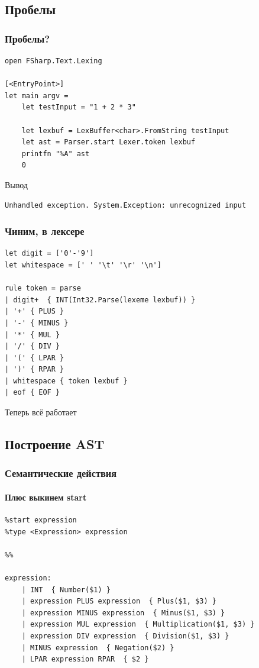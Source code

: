 \documentclass[xetex,mathserif,serif]{beamer}
\begin{document}
    \subsection{Пробелы}

    \begin{frame}[fragile]
        \frametitle{Пробелы?}
        \begin{verbatim}
open FSharp.Text.Lexing

[<EntryPoint>]
let main argv =
    let testInput = "1 + 2 * 3"

    let lexbuf = LexBuffer<char>.FromString testInput
    let ast = Parser.start Lexer.token lexbuf
    printfn "%A" ast
    0 
        \end{verbatim}
        \begin{exampleblock}{Вывод}
            \begin{verbatim}
Unhandled exception. System.Exception: unrecognized input
            \end{verbatim}
        \end{exampleblock}
    \end{frame}

    \begin{frame}[fragile]
        \frametitle{Чиним, в лексере}
        \begin{verbatim}
let digit = ['0'-'9']
let whitespace = [' ' '\t' '\r' '\n']

rule token = parse
| digit+  { INT(Int32.Parse(lexeme lexbuf)) }
| '+' { PLUS }
| '-' { MINUS }
| '*' { MUL }
| '/' { DIV }
| '(' { LPAR }
| ')' { RPAR }
| whitespace { token lexbuf }
| eof { EOF }
        \end{verbatim}
        Теперь всё работает
    \end{frame}

    \subsection{Построение AST}

    \begin{frame}[fragile]
        \frametitle{Семантические действия}
        \framesubtitle{Плюс выкинем start}
        \begin{verbatim}
%start expression
%type <Expression> expression

%%

expression:
    | INT  { Number($1) }
    | expression PLUS expression  { Plus($1, $3) }
    | expression MINUS expression  { Minus($1, $3) }
    | expression MUL expression  { Multiplication($1, $3) }
    | expression DIV expression  { Division($1, $3) }
    | MINUS expression  { Negation($2) }
    | LPAR expression RPAR  { $2 }
        \end{verbatim}
    \end{frame}
\end{document}
